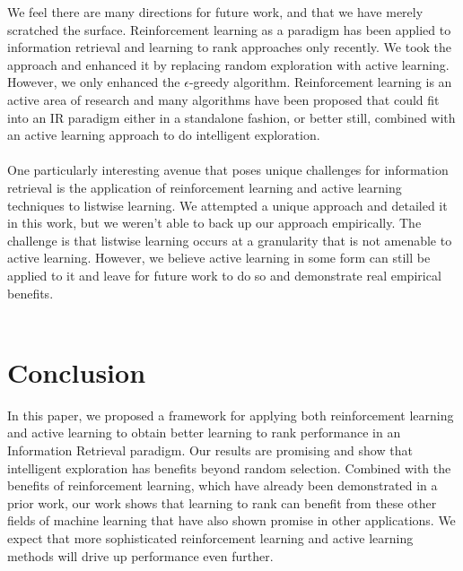 \documentclass{acm_proc_article-sp}
\begin{document}
We feel there are many directions for future work, and that we have merely scratched the surface. Reinforcement learning as a paradigm has been applied to information retrieval and learning to rank approaches only recently. We took the approach and enhanced it by replacing random exploration with active learning. However, we only enhanced the $\epsilon$-greedy algorithm. Reinforcement learning is an active area of research and many algorithms have been proposed \cite{rl} that could fit into an IR paradigm either in a standalone fashion, or better still, combined with an active learning approach to do intelligent exploration.\\ \\
One particularly interesting avenue that poses unique challenges for information retrieval is the application of reinforcement learning and active learning techniques to listwise learning. We attempted a unique approach and detailed it in this work, but we weren't able to back up our approach empirically. The challenge is that listwise learning occurs at a granularity that is not amenable to active learning. However, we believe active learning in some form can still be applied to it and leave for future work to do so and demonstrate real empirical benefits. \\ \\
  

\section{Conclusion}
In this paper, we proposed a framework for applying both reinforcement learning and active learning to obtain better learning to rank performance in an Information Retrieval paradigm. Our results are promising and show that intelligent exploration has benefits beyond random selection. Combined with the benefits of reinforcement learning, which have already been demonstrated in a prior work, our work shows that learning to rank can benefit from these other fields of machine learning that have also shown promise in other applications. We expect that more sophisticated reinforcement learning and active learning methods will drive up performance even further. 



\balancecolumns
\end{document}
